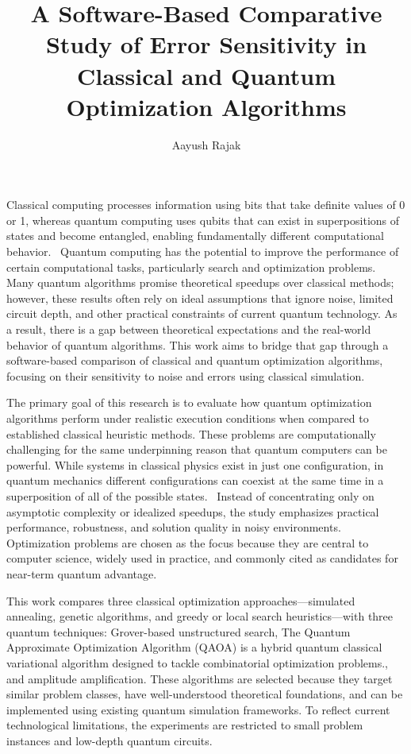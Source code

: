 \documentclass[12pt]{article}
\title{\textbf{A Software-Based Comparative Study of Error Sensitivity in Classical and Quantum Optimization Algorithms}}
\author{Aayush Rajak}
\begin{document}
\maketitle

Classical computing processes information using bits that take definite values of 0 or 1, whereas quantum computing uses qubits that can exist in superpositions of states and become entangled, enabling fundamentally different computational behavior.~\cite{wong2019} Quantum computing has the potential to improve the performance of certain computational tasks, particularly search and optimization problems. Many quantum algorithms promise theoretical speedups over classical methods; however, these results often rely on ideal assumptions that ignore noise, limited circuit depth, and other practical constraints of current quantum technology. As a result, there is a gap between theoretical expectations and the real-world behavior of quantum algorithms. This work aims to bridge that gap through a software-based comparison of classical and quantum optimization algorithms, focusing on their sensitivity to noise and errors using classical simulation.

The primary goal of this research is to evaluate how quantum optimization algorithms perform under realistic execution conditions when compared to established classical heuristic methods. These problems are computationally challenging for the same underpinning reason that quantum computers can be powerful. While systems in classical physics exist in just one configuration, in quantum mechanics different configurations can coexist at the same time in a superposition of all of the possible states.~\cite{daley2022} Instead of concentrating only on asymptotic complexity or idealized speedups, the study emphasizes practical performance, robustness, and solution quality in noisy environments. Optimization problems are chosen as the focus because they are central to computer science, widely used in practice, and commonly cited as candidates for near-term quantum advantage.

This work compares three classical optimization approaches—simulated annealing, genetic algorithms, and greedy or local search heuristics—with three quantum techniques: Grover-based unstructured search, The Quantum Approximate Optimization Algorithm (QAOA) is a hybrid quantum classical variational algorithm designed to tackle combinatorial optimization problems., ~\cite{zhou2020} and amplitude amplification. These algorithms are selected because they target similar problem classes, have well-understood theoretical foundations, and can be implemented using existing quantum simulation frameworks. To reflect current technological limitations, the experiments are restricted to small problem instances and low-depth quantum circuits.
\end{document}
